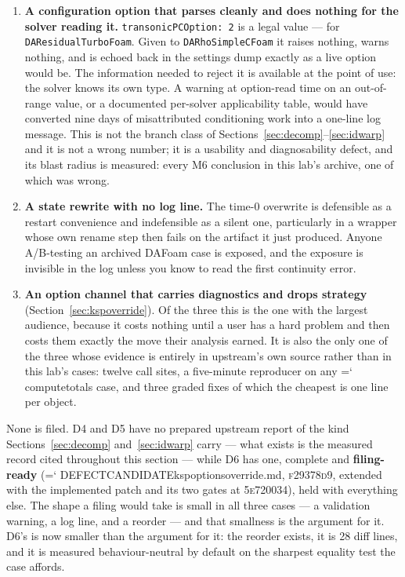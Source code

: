 \documentclass[11pt,a4paper]{article}
\newcommand{\artifact}[1]{{\small\ttfamily\hyphenchar\font=`\-\relax
  \def\_{\textunderscore\allowbreak}#1}}
\newcommand{\commit}[1]{\textsc{\small #1}}
\begin{document}
\begin{enumerate}
\item \textbf{A configuration option that parses cleanly and does nothing for the solver
reading it.} \texttt{transonicPCOption: 2} is a legal value --- for
\texttt{DAResidualTurboFoam}. Given to \texttt{DARhoSimpleCFoam} it raises nothing, warns
nothing, and is echoed back in the settings dump exactly as a live option would be. The
information needed to reject it is available at the point of use: the solver knows its own
type. A warning at option-read time on an out-of-range value, or a documented per-solver
applicability table, would have converted nine days of misattributed conditioning work into a
one-line log message. This is not the branch class of Sections~\ref{sec:decomp}--\ref{sec:idwarp}
and it is not a wrong number; it is a usability and diagnosability defect, and its blast
radius is measured: every M6 conclusion in this lab's archive, one of which was wrong.
\item \textbf{A state rewrite with no log line.} The time-0 overwrite is defensible as a
restart convenience and indefensible as a silent one, particularly in a wrapper whose own
rename step then fails on the artifact it just produced. Anyone A/B-testing an archived DAFoam
case is exposed, and the exposure is invisible in the log unless you know to read the first
continuity error.
\item \textbf{An option channel that carries diagnostics and drops strategy}
(Section~\ref{sec:kspoverride}). Of the three this is the one with the largest audience,
because it costs nothing until a user has a hard problem and then costs them exactly the move
their analysis earned. It is also the only one of the three whose evidence is entirely in
upstream's own source rather than in this lab's cases: twelve call sites, a five-minute
reproducer on any \artifact{compute\_totals} case, and three graded fixes of which the cheapest
is one line per object.
\end{enumerate}

None is filed. D4 and D5 have no prepared upstream report of the kind
Sections~\ref{sec:decomp} and~\ref{sec:idwarp} carry --- what exists is the measured record
cited throughout this section --- while D6 has one, complete and \textbf{filing-ready}
(\artifact{DEFECT\_CANDIDATE\_ksp\_options\_override.md}, \commit{f29378d9}, extended with the
implemented patch and its two gates at \commit{5e720034}), held with
everything else. The shape a filing would take is small in all three cases --- a validation
warning, a log line, and a reorder --- and that smallness is the argument for it. D6's is now
smaller than the argument for it: the reorder exists, it is 28 diff lines, and it is measured
behaviour-neutral by default on the sharpest equality test the case affords.
\end{document}
